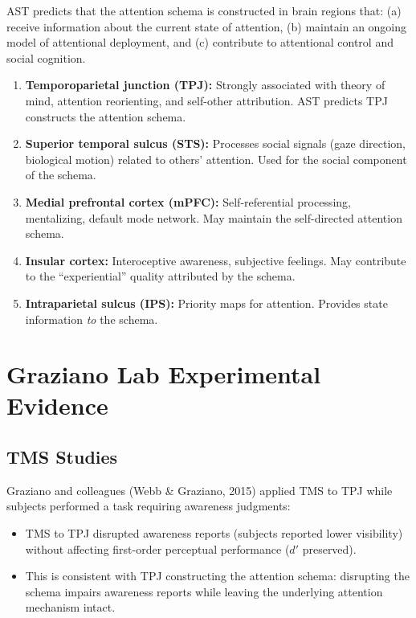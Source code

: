 \documentclass[11pt,a4paper]{report}
\begin{document}
AST predicts that the attention schema is constructed in brain regions that: (a) receive information about the current state of attention, (b) maintain an ongoing model of attentional deployment, and (c) contribute to attentional control and social cognition.

\begin{mechbox}
\begin{enumerate}[leftmargin=1.5em]
  \item \textbf{Temporoparietal junction (TPJ):} Strongly associated with theory of mind, attention reorienting, and self-other attribution. AST predicts TPJ constructs the attention schema.
  \item \textbf{Superior temporal sulcus (STS):} Processes social signals (gaze direction, biological motion) related to others' attention. Used for the social component of the schema.
  \item \textbf{Medial prefrontal cortex (mPFC):} Self-referential processing, mentalizing, default mode network. May maintain the self-directed attention schema.
  \item \textbf{Insular cortex:} Interoceptive awareness, subjective feelings. May contribute to the ``experiential'' quality attributed by the schema.
  \item \textbf{Intraparietal sulcus (IPS):} Priority maps for attention. Provides state information \emph{to} the schema.
\end{enumerate}
\end{mechbox}

\section{Graziano Lab Experimental Evidence}

\subsection{TMS Studies}

Graziano and colleagues (Webb \& Graziano, 2015) applied TMS to TPJ while subjects performed a task requiring awareness judgments:
\begin{itemize}[leftmargin=1.5em]
  \item TMS to TPJ disrupted awareness reports (subjects reported lower visibility) without affecting first-order perceptual performance ($d'$ preserved).
  \item This is consistent with TPJ constructing the attention schema: disrupting the schema impairs awareness reports while leaving the underlying attention mechanism intact.
\end{itemize}
\end{document}
